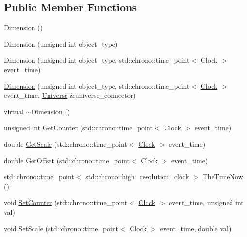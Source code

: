 \subsection*{Public Member Functions}
\begin{DoxyCompactItemize}
\item 
\hyperlink{class_dimension_aa61dad15f33b6c3d09028ba9e545aa70}{Dimension} ()
\item 
\hyperlink{class_dimension_a68def81e037c1bcc005591f45c53e3a3}{Dimension} (unsigned int object\+\_\+type)
\item 
\hyperlink{class_dimension_ab48cbe6ca22404ab5a2c522498c38d7c}{Dimension} (unsigned int object\+\_\+type, std\+::chrono\+::time\+\_\+point$<$ \hyperlink{universe_8h_a0ef8d951d1ca5ab3cfaf7ab4c7a6fd80}{Clock} $>$ event\+\_\+time)
\item 
\hyperlink{class_dimension_a9282c4669e8f97dce010324886d79a99}{Dimension} (unsigned int object\+\_\+type, std\+::chrono\+::time\+\_\+point$<$ \hyperlink{universe_8h_a0ef8d951d1ca5ab3cfaf7ab4c7a6fd80}{Clock} $>$ event\+\_\+time, \hyperlink{class_universe}{Universe} \&universe\+\_\+connector)
\item 
virtual \hyperlink{class_dimension_aa990dfd442020c193a1941e9dffbfbee}{$\sim$\+Dimension} ()
\item 
unsigned int \hyperlink{class_dimension_a2fbee64eeea5de3d8eab10cf0fdb6363}{Get\+Counter} (std\+::chrono\+::time\+\_\+point$<$ \hyperlink{universe_8h_a0ef8d951d1ca5ab3cfaf7ab4c7a6fd80}{Clock} $>$ event\+\_\+time)
\item 
double \hyperlink{class_dimension_a6985e3d8738202530cb2cd428b5b884c}{Get\+Scale} (std\+::chrono\+::time\+\_\+point$<$ \hyperlink{universe_8h_a0ef8d951d1ca5ab3cfaf7ab4c7a6fd80}{Clock} $>$ event\+\_\+time)
\item 
double \hyperlink{class_dimension_a58009cd435ead4b7b2f395a11fda0ae8}{Get\+Offset} (std\+::chrono\+::time\+\_\+point$<$ \hyperlink{universe_8h_a0ef8d951d1ca5ab3cfaf7ab4c7a6fd80}{Clock} $>$ event\+\_\+time)
\item 
std\+::chrono\+::time\+\_\+point$<$ std\+::chrono\+::high\+\_\+resolution\+\_\+clock $>$ \hyperlink{class_dimension_ab39b7ff253ade59c5c2d807c511b4028}{The\+Time\+Now} ()
\item 
void \hyperlink{class_dimension_a75c6a1a1e09c40b5860dc11a83384d9f}{Set\+Counter} (std\+::chrono\+::time\+\_\+point$<$ \hyperlink{universe_8h_a0ef8d951d1ca5ab3cfaf7ab4c7a6fd80}{Clock} $>$ event\+\_\+time, unsigned int val)
\item 
void \hyperlink{class_dimension_a7f655ea002e8f9614a8c5cfa1807c49c}{Set\+Scale} (std\+::chrono\+::time\+\_\+point$<$ \hyperlink{universe_8h_a0ef8d951d1ca5ab3cfaf7ab4c7a6fd80}{Clock} $>$ event\+\_\+time, double val)

\end{DoxyCompactItemize}
